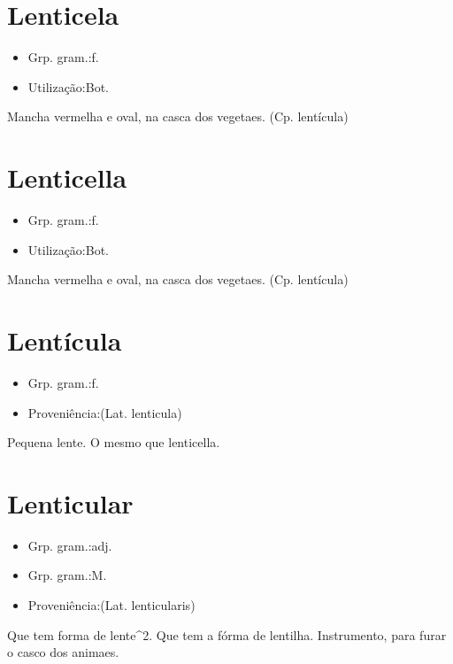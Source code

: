 \section{Lenticela}
\begin{itemize}
\item {Grp. gram.:f.}
\end{itemize}
\begin{itemize}
\item {Utilização:Bot.}
\end{itemize}
Mancha vermelha e oval, na casca dos vegetaes.
(Cp. \textunderscore lentícula\textunderscore )
\section{Lenticella}
\begin{itemize}
\item {Grp. gram.:f.}
\end{itemize}
\begin{itemize}
\item {Utilização:Bot.}
\end{itemize}
Mancha vermelha e oval, na casca dos vegetaes.
(Cp. \textunderscore lentícula\textunderscore )
\section{Lentícula}
\begin{itemize}
\item {Grp. gram.:f.}
\end{itemize}
\begin{itemize}
\item {Proveniência:(Lat. \textunderscore lenticula\textunderscore )}
\end{itemize}
Pequena lente.
O mesmo que \textunderscore lenticella\textunderscore .
\section{Lenticular}
\begin{itemize}
\item {Grp. gram.:adj.}
\end{itemize}
\begin{itemize}
\item {Grp. gram.:M.}
\end{itemize}
\begin{itemize}
\item {Proveniência:(Lat. \textunderscore lenticularis\textunderscore )}
\end{itemize}
Que tem forma de \textunderscore lente\textunderscore ^2.
Que tem a fórma de lentilha.
Instrumento, para furar o casco dos animaes.
